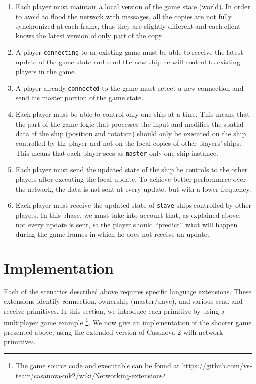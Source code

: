 \begin{enumerate}
	\item Each player must maintain a local version of the game state (world). In order to avoid to flood the network with messages, all the copies are not fully synchronized at each frame, thus they are slightly different and each client knows the latest version of only part of the copy.
	\item A player \texttt{connecting} to an existing game must be able to receive the latest update of the game state and send the new ship he will control to existing players in the game.
	\item A player already \texttt{connected} to the game must detect a new connection and send his master portion of the game state.
	\item Each player must be able to control only one ship at a time. This means that the part of the game logic that processes the input and modifies the spatial data of the ship (position and rotation) should only be executed on the ship controlled by the player and not on the local copies of other players' ships. This means that each player sees as \texttt{master} only one ship instance.
	\item Each player must send the updated state of the ship he controls to the other players after executing the local update. To achieve better performance over the network, the data is not sent at every update, but with a lower frequency.
	\item Each player must receive the updated state of \texttt{slave} ships controlled by other players. In this phase, we must take into account that, as explained above, not every update is sent, so the player should ``predict'' what will happen during the game frames in which he does not receive an update.
\end{enumerate}

\section{Implementation}
Each of the scenarios described above requires specific language extensions. These extensions identify connection, ownership (master/slave), and various send and receive primitives. In this section, we introduce each primitive by using a multiplayer game example \footnote{The game source code and executable can be found at \url{https://github.com/vs-team/casanova-mk2/wiki/Networking-extension}}. We now give an implementation of the shooter game presented above, using the extended version of Casanova 2 with network primitives. 

